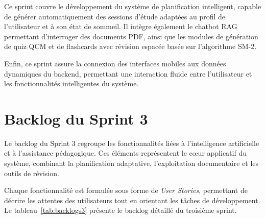 Ce sprint couvre le développement du système de planification intelligent, capable de générer automatiquement des sessions d'étude adaptées au profil de l'utilisateur et à son état de sommeil. Il intègre également le chatbot RAG permettant d'interroger des documents PDF, ainsi que les modules de génération de quiz QCM et de flashcards avec révision espacée basée sur l'algorithme SM-2.

Enfin, ce sprint assure la connexion des interfaces mobiles aux données dynamiques du backend, permettant une interaction fluide entre l'utilisateur et les fonctionnalités intelligentes du système.

\section{Backlog du Sprint 3}

Le backlog du Sprint 3 regroupe les fonctionnalités liées à l'intelligence artificielle et à l'assistance pédagogique. Ces éléments représentent le cœur applicatif du système, combinant la planification adaptative, l'exploitation documentaire et les outils de révision.

Chaque fonctionnalité est formulée sous forme de \textit{User Stories}, permettant de décrire les attentes des utilisateurs tout en orientant les tâches de développement. Le tableau~\ref{tab:backlogs3} présente le backlog détaillé du troisième sprint.


